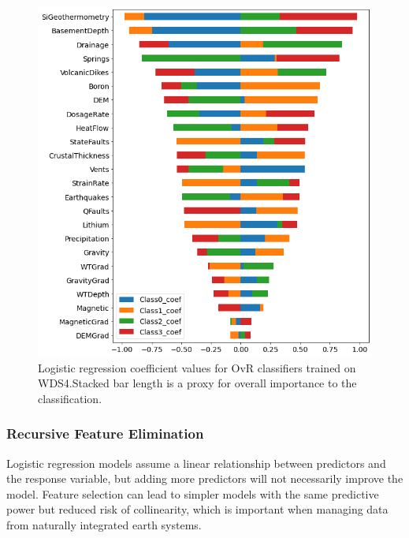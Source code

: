 \begin{figure}[!htp]
\centering
\includegraphics[width=\textwidth]{templates/images/Figure-LR-coefficients.png}
\singlespacing
\caption[Logistic regression feature coefficients]{Logistic regression coefficient values for OvR classifiers trained on WDS4.Stacked bar length is a proxy for overall importance to the classification.}
\label{fig:logreg_coefs}
\end{figure}

\subsubsection{Recursive Feature Elimination} \label{ch5:logreg_rfe}
Logistic regression models assume a linear relationship between predictors and the response variable, but adding more predictors will not necessarily improve the model. Feature selection can lead to simpler models with the same predictive power but reduced risk of collinearity, which is important when managing data from naturally integrated earth systems. 

